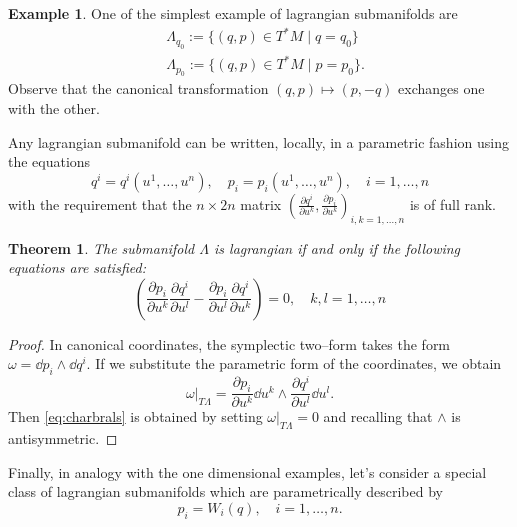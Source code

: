 \documentclass[english,fontsize=11pt,paper=b5]{scrbook}
\numberwithin{equation}{chapter}
\newtheorem{theorem}{Theorem}[chapter]
\theoremstyle{definition}
\newtheorem{example}{Example}[chapter]
\begin{document}
    \begin{example}
      One of the simplest example of lagrangian submanifolds are
      \begin{align}
     & \Lambda_{q_0} := \big\{(q,p)\in T^*M \mid q=q_0\big\}  \\
     & \Lambda_{p_0} := \big\{(q,p)\in T^*M \mid p=p_0\big\}.
      \end{align}
      Observe that the canonical transformation $(q,p) \mapsto (p,-q)$ exchanges one with the other.
    \end{example}

    Any lagrangian submanifold can be written, locally, in a parametric fashion using the equations
    \begin{equation}
      q^i = q^i(u^1, \ldots, u^n), \quad p_i = p_i(u^1, \ldots, u^n), \quad i=1,\ldots,n
    \end{equation}
    with the requirement that the $n\times2n$ matrix $\left(\frac{\partial q^i}{\partial u^k}, \frac{\partial p_i}{\partial u^k}\right)_{i,k=1,\ldots,n}$ is of full rank.

    \begin{theorem}\label{thm:charbrals}
      The submanifold $\Lambda$ is lagrangian if and only if the following equations are satisfied:
      \begin{equation}\label{eq:charbrals}
        \left(\frac{\partial p_i}{\partial u^k}\frac{\partial q^i}{\partial u^l} - \frac{\partial p_i}{\partial u^l}\frac{\partial q^i}{\partial u^k} \right) = 0,
        \quad k,l=1,\ldots,n
      \end{equation}
    \end{theorem}
    \begin{proof}
      In canonical coordinates, the symplectic two--form takes the form $\omega = \dd p_i \wedge \dd q^i$. If we substitute the parametric form of the coordinates, we obtain
      \begin{equation}
        \omega |_{T\Lambda} = \frac{\partial p_i}{\partial u^k}\dd u^k \wedge \frac{\partial q^i}{\partial u^l}\dd u^l.
      \end{equation}
      Then \eqref{eq:charbrals} is obtained by setting $\omega |_{T\Lambda} = 0$ and recalling that $\wedge$ is antisymmetric.
    \end{proof}

    Finally, in analogy with the one dimensional examples, let's consider a special class of lagrangian submanifolds which are parametrically described by
    \begin{equation}\label{eq:lagsbmPofQ}
      p_i = W_i(q), \quad i=1,\ldots,n.
    \end{equation}
\end{document}
